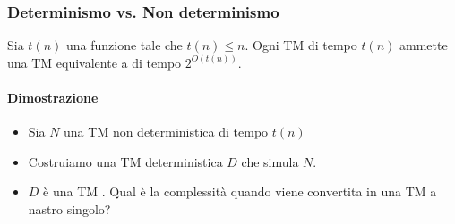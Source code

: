 \subsubsection{Determinismo vs. Non determinismo}
\begin{theorem}
  Sia $t(n)$ una funzione tale che $t(n)\leq n$. Ogni TM 
  di tempo $t(n)$ ammette una TM equivalente a  di tempo 
  $2^{O(t(n))}$.
\end{theorem}
\paragraph{Dimostrazione}
\begin{itemize}
  \item Sia $N$ una TM non deterministica di tempo $t(n)$ 
  \item Costruiamo una TM deterministica $D$ che simula $N$. 
  \item $D$ è una TM . Qual è la complessità quando viene 
    convertita in una TM a nastro singolo? 
\end{itemize}
